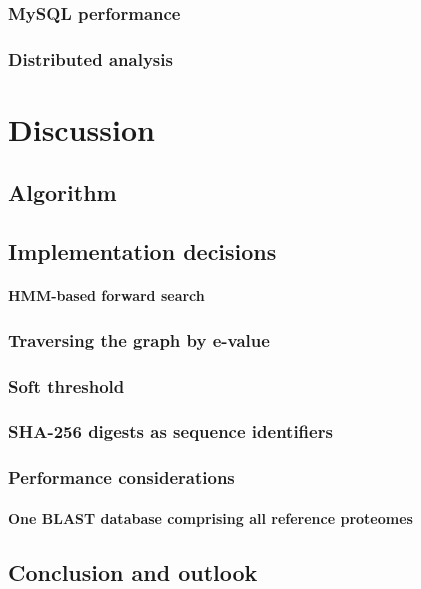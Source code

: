 \documentclass[a4paper,12pt]{scrreprt}
\begin{document}
		\subsection{MySQL performance}
			
		\subsection{Distributed analysis}
			

\chapter{Discussion}
	
	\section{Algorithm}
		
	\section{Implementation decisions}
		\subsubsection{HMM-based forward search}
			
		\subsection{Traversing the graph by e-value}
			
		\subsection{Soft threshold}
		\subsection{SHA-256 digests as sequence identifiers}
			
		\subsection{Performance considerations}
			\subsubsection{One BLAST database comprising all reference proteomes}
				
	\section{Conclusion and outlook}
\end{document}
